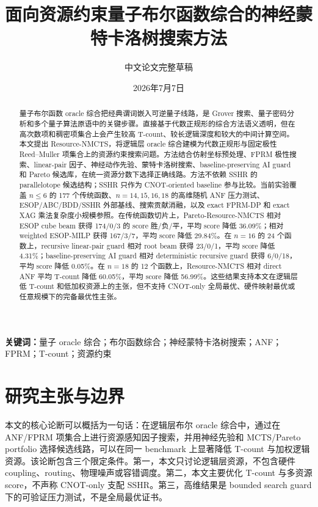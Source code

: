\documentclass[UTF8,fontset=macnew,11pt]{ctexart}
\title{面向资源约束量子布尔函数综合的神经蒙特卡洛树搜索方法}
\author{中文论文完整草稿}
\date{2026年7月7日}
\newcommand{\method}{Resource-NMCTS}
\newcommand{\pareto}{Pareto-Resource-NMCTS}
\begin{document}
\maketitle

\begin{abstract}
量子布尔函数 oracle 综合把经典谓词嵌入可逆量子线路，是 Grover 搜索、量子密码分析和多个量子算法原语中的关键步骤。直接基于代数正规形的综合方法语义透明，但在高次数项和稠密项集合上会产生较高 T-count、较长逻辑深度和较大的中间计算空间。本文提出 \method{}，将逻辑层 oracle 综合建模为代数正规形与固定极性 Reed--Muller 项集合上的资源约束搜索问题。方法结合仿射坐标预处理、FPRM 极性搜索、linear-pair 因子、神经动作先验、蒙特卡洛树搜索、baseline-preserving AI guard 和 Pareto 候选库，在统一资源分数下选择正确线路。方法不依赖 SSHR 的 parallelotope 候选结构；SSHR 只作为 CNOT-oriented baseline 参与比较。当前实验覆盖 $n\leq 6$ 的 177 个传统函数、$n=14,15,16,18$ 的高维随机 ANF 压力测试、ESOP/ABC/BDD/SSHR 外部基线、搜索贡献消融，以及 exact FPRM-DP 和 exact XAG 乘法复杂度小规模参照。在传统函数切片上，\pareto{} 相对 ESOP cube beam 获得 174/0/3 的 score 胜/负/平，平均 score 降低 36.09\%；相对 weighted ESOP-MILP 获得 167/3/7，平均 score 降低 29.84\%。在 $n=16$ 的 24 个函数上，recursive linear-pair guard 相对 root beam 获得 23/0/1，平均 score 降低 4.31\%；baseline-preserving AI guard 相对 deterministic recursive guard 获得 6/0/18，平均 score 降低 0.05\%。在 $n=18$ 的 12 个函数上，\method{} 相对 direct ANF 平均 T-count 降低 60.05\%，平均 score 降低 56.99\%。这些结果支持本文在逻辑层低 T-count 和低加权资源上的主张，但不支持 CNOT-only 全局最优、硬件映射最优或任意规模下的完备最优性主张。
\end{abstract}

\noindent\textbf{关键词：}量子 oracle 综合；布尔函数综合；神经蒙特卡洛树搜索；ANF；FPRM；T-count；资源约束

\section{研究主张与边界}

本文的核心论断可以概括为一句话：在逻辑层布尔 oracle 综合中，通过在 ANF/FPRM 项集合上进行资源感知因子搜索，并用神经先验和 MCTS/Pareto portfolio 选择候选线路，可以在同一 benchmark 上显著降低 T-count 与加权逻辑资源。该论断包含三个限定条件。第一，本文只讨论逻辑层资源，不包含硬件 coupling、routing、物理噪声或容错调度。第二，本文主要优化 T-count 与多资源 score，不声称 CNOT-only 支配 SSHR。第三，高维结果是 bounded search guard 下的可验证压力测试，不是全局最优证书。
\end{document}

